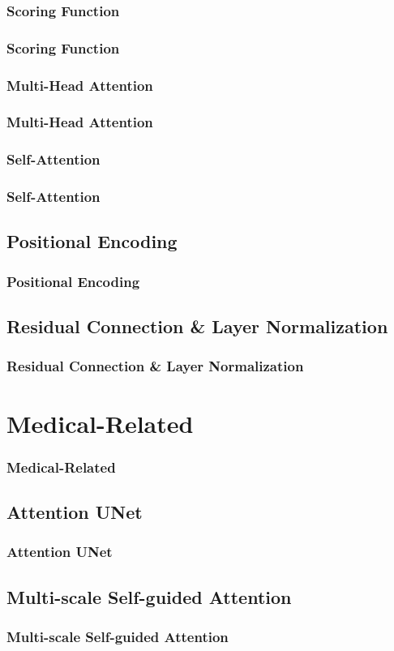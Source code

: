 \documentclass[]{beamer}
\begin{document}
\subsubsection{Scoring Function}
\begin{frame}
    \frametitle{Scoring Function}
\end{frame}

\subsubsection{Multi-Head Attention}
\begin{frame}
    \frametitle{Multi-Head Attention}
\end{frame}

\subsubsection{Self-Attention}
\begin{frame}
    \frametitle{Self-Attention}
\end{frame}



\subsection{Positional Encoding}
\begin{frame}
    \frametitle{Positional Encoding}
\end{frame}

\subsection{Residual Connection \& Layer Normalization}
\begin{frame}
    \frametitle{Residual Connection \& Layer Normalization}
\end{frame}

\section{Medical-Related}
\begin{frame}
    \frametitle{Medical-Related}
\end{frame}

\subsection{Attention UNet}
\begin{frame}
    \frametitle{Attention UNet}
\end{frame}

\subsection{Multi-scale Self-guided Attention}
\begin{frame}
    \frametitle{Multi-scale Self-guided Attention}
\end{frame}
\end{document}
